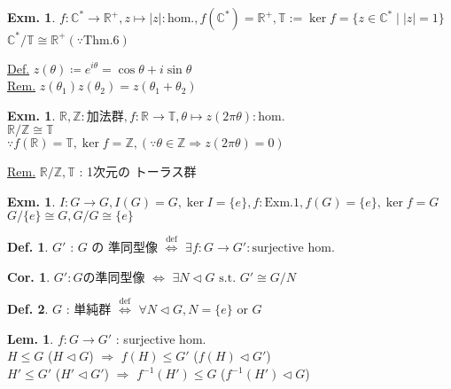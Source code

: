 \documentclass[uplatex,dvipdfmx,9pt]{beamer}
\newcommand{\defarrow}{\overset{\mathrm{def}}{\Leftrightarrow}}
\newcommand{\nsubgroup}{\vartriangleleft} %
\newcommand{\inverse}[1]{#1^{-1}}
\newcommand{\st}{\text{ s.t. }}
\newcounter{textThmCount}
\newcounter{textLemCount}
\newcounter{textExmCount}
\theoremstyle{definition} %
\newtheorem{defn}{Def.}[subsection] %
\newtheorem{corText}{Cor.}[textThmCount] %
\newtheorem{lemText}[textLemCount]{Lem.} %
\theoremstyle{example}
\newtheorem{exmText}[textExmCount]{Exm.}
\begin{document}
      \begin{frame}

        \begin{exmText}
          $f\colon \mathbb{C}^* \to \mathbb{R}^+, z \mapsto |z| : \text{hom.}, f(\mathbb{C}^*) = \mathbb{R}^+, \mathbb{T} := \ker f = \{z \in \mathbb{C}^* \mid |z| = 1\}$ \\
          $\mathbb{C}^* / \mathbb{T} \cong \mathbb{R}^+ (\because \text{Thm.6})$
        \end{exmText}

        \underline{Def.} $z(\theta) \coloneqq e^{i\theta} = \cos \theta + i \sin \theta$ \\
        \underline{Rem.} $z(\theta_1)z(\theta_2) = z(\theta_1 + \theta_2)$
        \begin{exmText}
          $\mathbb{R}, \mathbb{Z} : \text{加法群}, f\colon \mathbb{R} \to \mathbb{T}, \theta \mapsto z(2\pi\theta) : \text{hom.}$ \\
          $\mathbb{R} / \mathbb{Z} \cong \mathbb{T}$ \\
          $\because f(\mathbb{R}) = \mathbb{T}, \ker f = \mathbb{Z}, (\because \theta \in \mathbb{Z} \Rightarrow z(2\pi\theta) = 0)$
        \end{exmText}
        \underline{Rem.} $\mathbb{R}/\mathbb{Z}, \mathbb{T}$ : 1次元の \alert{トーラス群}

        \begin{exmText}
          $I\colon G \to G, I(G) = G, \ker I = \{e\}, f : \text{Exm.1}, f(G) = \{e\}, \ker f = G$ \\
          $G/\{e\} \cong G, G/G \cong \{e\}$
        \end{exmText}
        
      \end{frame}

      \begin{frame}

        \begin{defn}
          $G'$ : $G$ の \alert{準同型像} $\defarrow$ $\exists f\colon G \to G' : \text{surjective hom.}$
        \end{defn}

        \begin{corText}
          $G': G \text{の準同型像}$ $\Leftrightarrow$ $\exists N \nsubgroup G \st G' \cong G/N$
        \end{corText}

        \begin{defn}
          $G$ : \alert{単純群} $\defarrow$ $\forall N \nsubgroup G, N = \{e\}$ or $G$
        \end{defn}
        
        \begin{lemText}
          $f\colon G \to G'$ : surjective hom. \\
          $H \le G$ ($H \nsubgroup G$) $\Rightarrow$ $f(H) \le G'$ ($f(H) \nsubgroup G'$) \\
          $H' \le G'$ ($H' \nsubgroup G'$) $\Rightarrow$ $\inverse{f}(H') \le G$ ($\inverse{f}(H') \nsubgroup G$)
        \end{lemText}

      \end{frame}
\end{document}
